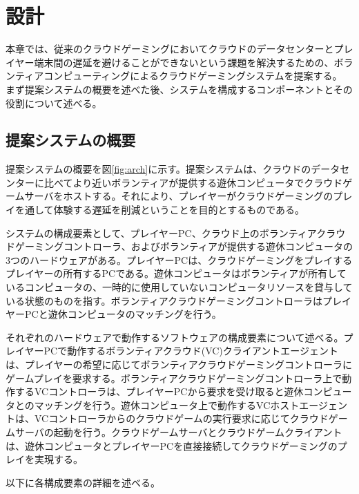 \section{設計}

本章では、従来のクラウドゲーミングにおいてクラウドのデータセンターとプレイヤー端末間の遅延を避けることができないという課題を解決するための、ボランティアコンピューティングによるクラウドゲーミングシステムを提案する。
まず提案システムの概要を述べた後、システムを構成するコンポーネントとその役割について述べる。

\subsection{提案システムの概要}
提案システムの概要を図\ref{fig:arch}に示す。提案システムは、クラウドのデータセンターに比べてより近いボランティアが提供する遊休コンピュータでクラウドゲームサーバをホストする。それにより、プレイヤーがクラウドゲーミングのプレイを通して体験する遅延を削減ということを目的とするものである。

システムの構成要素として、プレイヤーPC、クラウド上のボランティアクラウドゲーミングコントローラ、およびボランティアが提供する遊休コンピュータの3つのハードウェアがある。プレイヤーPCは、クラウドゲーミングをプレイするプレイヤーの所有するPCである。遊休コンピュータはボランティアが所有しているコンピュータの、一時的に使用していないコンピュータリソースを貸与している状態のものを指す。ボランティアクラウドゲーミングコントローラはプレイヤーPCと遊休コンピュータのマッチングを行う。

それぞれのハードウェアで動作するソフトウェアの構成要素について述べる。プレイヤーPCで動作するボランティアクラウド(VC)クライアントエージェントは、プレイヤーの希望に応じてボランティアクラウドゲーミングコントローラにゲームプレイを要求する。ボランティアクラウドゲーミングコントローラ上で動作するVCコントローラは、プレイヤーPCから要求を受け取ると遊休コンピュータとのマッチングを行う。遊休コンピュータ上で動作するVCホストエージェントは、VCコントローラからのクラウドゲームの実行要求に応じてクラウドゲームサーバの起動を行う。クラウドゲームサーバとクラウドゲームクライアントは、遊休コンピュータとプレイヤーPCを直接接続してクラウドゲーミングのプレイを実現する。

以下に各構成要素の詳細を述べる。


